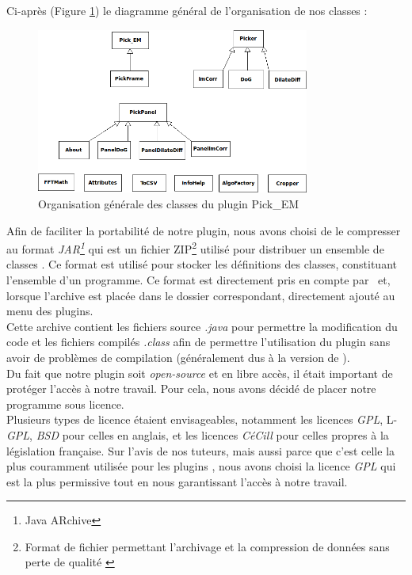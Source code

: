 Ci-après (Figure \ref{classes}) le diagramme général de l'organisation de nos classes :

\begin{figure}[!h] 
\begin{center}
\includegraphics[width=0.8\textwidth]{class_diagram.png}
\caption{Organisation générale des classes du plugin Pick\_EM}
\label{classes}
\end{center}
\end{figure}

\pagebreak
Afin de faciliter la portabilité de notre plugin, nous avons choisi de le compresser au format \emph{JAR\footnote{Java ARchive\cite{jar:url}}} qui est un fichier ZIP\footnote{Format de fichier permettant l'archivage et la compression de données sans perte de qualité \cite{zip:url}} utilisé pour distribuer un ensemble de classes \java. Ce format est utilisé pour stocker les définitions des classes, constituant l'ensemble d'un programme.
Ce format est directement pris en compte par \imj ~et, lorsque l'archive est placée dans le dossier correspondant, directement ajouté au menu des plugins.\\

Cette archive contient les fichiers source \emph{.java} pour permettre la modification du code et les fichiers compilés \emph{.class} afin de permettre l'utilisation du plugin sans avoir de problèmes de compilation (généralement dus à la version de \java ). \\

Du fait que notre plugin soit \textit{open-source} et en libre accès, il était important de protéger l'accès à notre travail. Pour cela, nous avons décidé de placer notre programme sous licence. \\
Plusieurs types de licence étaient envisageables, notamment les licences \emph{GPL}, L-\emph{GPL}, \emph{BSD} pour celles en anglais, et les licences \emph{CéCill} pour celles propres à la législation française. Sur l'avis de nos tuteurs, mais aussi parce que c'est celle la plus couramment utilisée pour les plugins \imj , nous avons choisi la licence \emph{GPL} qui est la plus permissive tout en nous garantissant l'accès à notre travail. 


